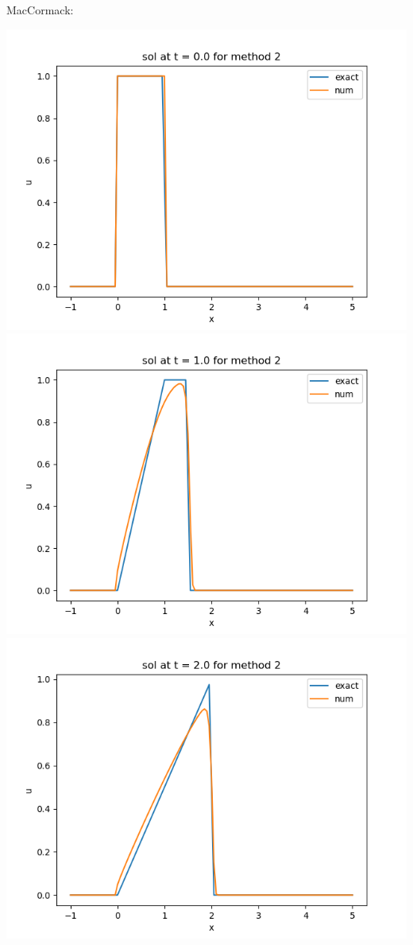\documentclass{article}
\begin{document}
\begin{enumerate}
MacCormack:
\begin{center}
	\includegraphics[scale=.23]{hw13 sol t = 0 method 2}
	\includegraphics[scale=.23]{hw13 sol t = 1 method 2}
	\includegraphics[scale=.23]{hw13 sol t = 2 method 2}

\end{center}
\end{enumerate}
\end{document}
